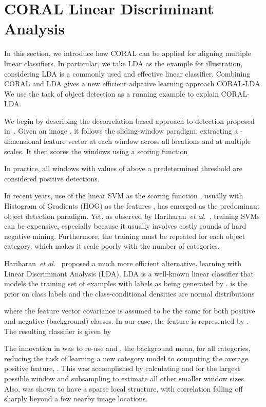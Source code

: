 \documentclass[graybox]{svmult}
\newcommand\etal{\textit{et al.}}
\begin{document}
 \section{CORAL Linear Discriminant Analysis}
\label{sec:coral-lda}

In this section, we introduce how CORAL can be applied for aligning multiple linear classifiers. In particular, we take LDA as the example for illustration, considering LDA is  a commonly used and effective linear classifier. Combining CORAL and LDA gives a new efficient adpative learning approach CORAL-LDA.  We use the task of object detection as a running example to explain CORAL-LDA.

We begin by describing the decorrelation-based approach to detection proposed in~\cite{who}. Given an image , it follows the sliding-window paradigm, extracting a -dimensional feature vector  at each window  across all locations and at multiple scales. 
It then scores the windows using a scoring function 

In practice, all windows with values of  above a predetermined threshold are considered positive detections.

In recent years, use of the linear SVM as the scoring function , usually with Histogram of Gradients (HOG) as the features , has emerged as the predominant object detection paradigm. Yet, as observed by Hariharan~\etal~\cite{who}, training SVMs can be expensive, especially because it usually involves costly rounds of hard negative mining. Furthermore, the training must be repeated for each object category, which makes it scale poorly with the number of categories.

Hariharan~\etal~\cite{who} proposed a much more efficient alternative, learning  with Linear Discriminant Analysis (LDA). LDA is a well-known linear classifier that models the training set of examples  with labels  as being generated by .  is the prior on class labels and the class-conditional densities are normal distributions 

where the feature vector covariance  is assumed to be the same for both positive and negative (background) classes. In our case, the feature is represented by . The resulting classifier is given by
\vspace{-0.1in}

The innovation in \cite{who} was to re-use  and , the background mean, for all categories, reducing the task of learning a new category model to computing the average positive feature, . This was accomplished by calculating  and  for the largest possible window and subsampling to estimate all other smaller window sizes. Also,  was shown to have a sparse local structure, with correlation falling off sharply beyond a few nearby image locations.
\end{document}
